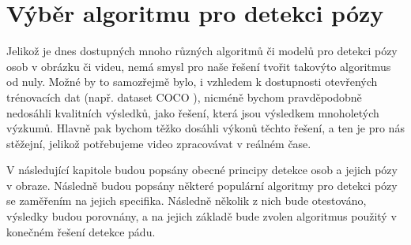 \chapter{Výběr algoritmu pro detekci pózy}
\label{sec:Pose}

Jelikož je dnes dostupných mnoho různých algoritmů či modelů pro detekci pózy
osob v obrázku či videu, nemá smysl pro naše řešení tvořit takovýto algoritmus
od nuly. Možné by to samozřejmě bylo, i vzhledem k dostupnosti otevřených
trénovacích dat (např. dataset COCO \cite{coco}), nicméně bychom pravděpodobně
nedosáhli kvalitních výsledků, jako řešení, která jsou výsledkem mnoholetých
výzkumů. Hlavně pak bychom těžko dosáhli výkonů těchto řešení, a ten je pro nás
stěžejní, jelikož potřebujeme video zpracovávat v reálném čase.

V následující kapitole budou popsány obecné principy detekce osob a jejich pózy v obraze. Následně budou popsány některé populární algoritmy pro detekci pózy se zaměřením na jejich specifika. Následně několik z nich bude otestováno, výsledky budou porovnány, a na jejich základě bude zvolen algoritmus použitý v konečném řešení detekce pádu.


\endinput
